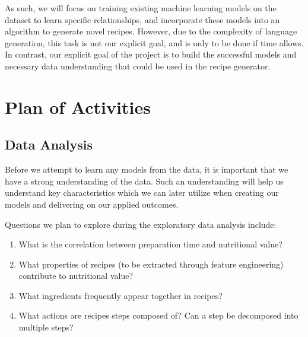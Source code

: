 \documentclass[sigconf]{acmart}
\begin{document}
As such, we will focus on training existing machine learning models on the dataset to learn specific relationships, and incorporate these models into an algorithm to generate novel recipes. However, due to the complexity of language generation, this task is not our explicit goal, and is only to be done if time allows. In contrast, our explicit goal of the project is to build the successful models and necessary data understanding that could be used in the recipe generator.



\section{Plan of Activities}
\subsection{Data Analysis}
Before we attempt to learn any models from the data, it is important that we have a strong understanding of the data. Such an understanding will help us understand key characteristics which we can later utilize when creating our models and delivering on our applied outcomes.

Questions we plan to explore during the exploratory data analysis include:

\begin{enumerate}
    \item What is the correlation between preparation time and nutritional value?
    \item What properties of recipes (to be extracted through feature engineering) contribute to nutritional value?
    \item What ingredients frequently appear together in recipes?
    \item What actions are recipes steps composed of? Can a step be decomposed into multiple steps?
\end{enumerate}
\end{document}
